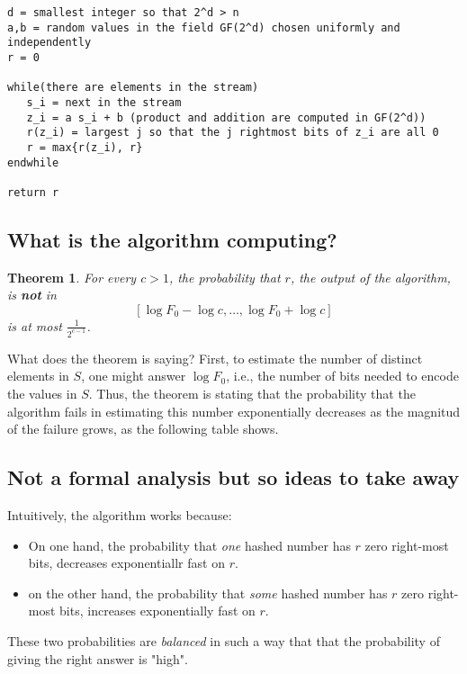 \documentclass[12pt]{article}
\newtheorem{theorem}{Theorem}
\begin{document}
\begin{verbatim}
d = smallest integer so that 2^d > n
a,b = random values in the field GF(2^d) chosen uniformly and independently
r = 0

while(there are elements in the stream)
   s_i = next in the stream
   z_i = a s_i + b (product and addition are computed in GF(2^d))
   r(z_i) = largest j so that the j rightmost bits of z_i are all 0
   r = max{r(z_i), r}       
endwhile

return r

\end{verbatim}



\subsection{What is the algorithm computing?}

\begin{theorem}
For every $c > 1$, the probability that $r$, the output of the algorithm, is {\bf not} in 
$$[\log F_0 - \log c, \hdots, \log F_0 + \log c]$$ 
is at most $\frac{1}{2^{c-1}}$.
\end{theorem}

What does the theorem is saying?
First, to estimate the number of distinct elements in $S$, one might answer $\log F_0$,
i.e., the number of bits needed to encode the values in $S$. 
Thus, the theorem is stating that the probability that the algorithm fails in estimating
this number exponentially decreases as the magnitud of the failure grows,
as the following table shows.


\subsection{Not a formal analysis but so ideas to take away}

Intuitively, the algorithm works because:
\begin{itemize}
\item On one hand, the probability that \emph{one} hashed number has $r$ zero right-most  bits, decreases exponentiallr fast on $r$.
\item on the other hand, the probability that \emph{some} hashed number has $r$ zero right-most bits, increases exponentially fast on $r$.
\end{itemize}
These two probabilities are \emph{balanced} in such a way that that the probability of giving the right answer is "high".
\end{document}

